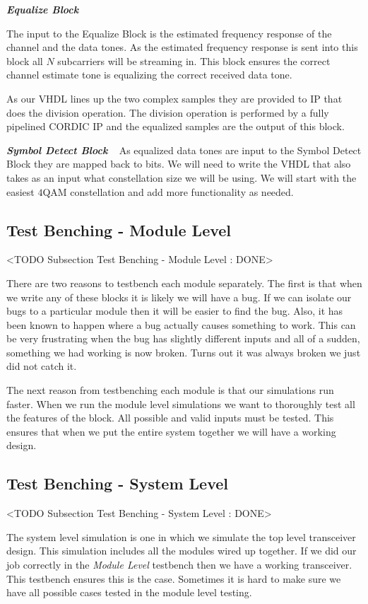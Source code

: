 {\bf \emph{Equalize Block}}

The input to the Equalize Block is the estimated frequency response of the channel and the data tones. As the estimated frequency response is sent into this block all $N$ subcarriers will be streaming in. This block ensures the correct channel estimate tone is equalizing the correct received data tone.

As our \ac{VHDL} lines up the two complex samples they are provided to \ac{IP} that does the division operation. The division operation is performed by a fully pipelined \ac{CORDIC} \ac{IP} and the equalized samples are the output of this block.

{\bf \emph{Symbol Detect Block}} 
 
As equalized data tones are input to the Symbol Detect Block they are mapped back to bits. We will need to write the \ac{VHDL} that also takes as an input what constellation size we will be using. We will start with the easiest $4$\ac{QAM} constellation and add more functionality as needed. 

\subsection{Test Benching - Module Level}
	<TODO Subsection Test Benching - Module Level : DONE>

There are two reasons to testbench each module separately. The first is that when we write any of these blocks it is likely we will have a bug. If we can isolate our bugs to a particular module then it will be easier to find the bug. Also, it has been known to happen where a bug actually causes something to work. This can be very frustrating when the bug has slightly different inputs and all of a sudden, something we had working is now broken. Turns out it was always broken we just did not catch it.

The next reason from testbenching each module is that our simulations run faster. When we run the module level simulations we want to thoroughly test all the features of the block. All possible and valid inputs must be tested. This ensures that when we put the entire system together we will have a working design.
	
\subsection{Test Benching - System Level}
	<TODO Subsection Test Benching - System Level : DONE>

The system level simulation is one in which we simulate the top level transceiver design. This simulation includes all the modules wired up together. If we did our job correctly in the \emph{Module Level} testbench then we have a working transceiver. This testbench ensures this is the case. Sometimes it is hard to make sure we have all possible cases tested in the module level testing.

